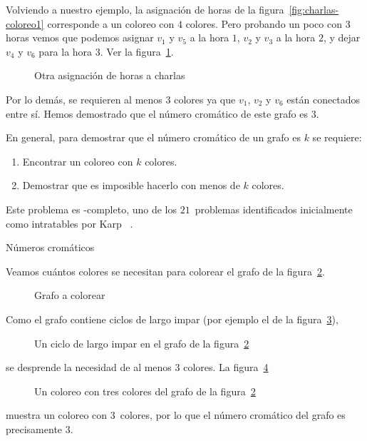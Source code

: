   Volviendo a nuestro ejemplo,
  la asignación de horas de la figura~\ref{fig:charlas-coloreo1}
  corresponde a un coloreo con \(4\) colores.
  Pero probando un poco con \(3\) horas
  vemos que podemos asignar \(v_1\) y \(v_5\) a la hora \(1\),
  \(v_2\) y \(v_3\) a la hora \(2\),
  y dejar \(v_4\) y \(v_6\) para la hora \(3\).
  Ver la figura~\ref{fig:charlas-coloreo2}.
  \begin{figure}[htbp]
    \centering
    \caption{Otra asignación de horas a charlas}
    \label{fig:charlas-coloreo2}
  \end{figure}
  Por lo demás,
  se requieren al menos \(3\) colores
  ya que \(v_1\), \(v_2\) y \(v_6\)
  están conectados entre sí.
  Hemos demostrado que el número cromático de este grafo es \(3\).

  En general,
  para demostrar que el número cromático de un grafo es \(k\)
  se requiere:
  \begin{enumerate}
  \item
    Encontrar un coloreo con \(k\) colores.
  \item
    Demostrar que es imposible hacerlo con menos de \(k\) colores.
  \end{enumerate}
  Este problema es \NP\nobreakdash-completo,
  uno de los \(21\)~problemas
  identificados inicialmente como intratables por Karp~%
    \cite{karp72:_reduc_among_combin_prob}.

  \begin{example}
    Números cromáticos

    Veamos cuántos colores se necesitan para colorear
    el grafo de la figura~\ref{fig:chromatic1}.
    \begin{figure}[htbp]
      \centering
      \caption{Grafo a colorear}
      \label{fig:chromatic1}
    \end{figure}

    Como el grafo contiene ciclos de largo impar
    (por ejemplo el de la figura~\ref{fig:chromatic1-ciclo}),
    \begin{figure}[htbp]
      \centering
      \caption{Un ciclo de largo impar
	       en el grafo de la figura~\ref{fig:chromatic1}}
      \label{fig:chromatic1-ciclo}
    \end{figure}
    se desprende la necesidad de al menos 3 colores.
    La figura~\ref{fig:chromatic1-coloreo}
    \begin{figure}[htbp]
      \centering
      \caption{Un coloreo con tres colores
	       del grafo de la figura~\ref{fig:chromatic1}}
      \label{fig:chromatic1-coloreo}
    \end{figure}
    muestra un coloreo con \(3\)~colores,
    por lo que el número cromático del grafo es precisamente \(3\).
  \end{example}

